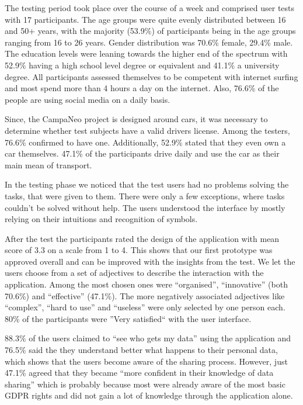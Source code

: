 \documentclass[../paper.tex]{subfiles}
\begin{document}
  The testing period took place over the course of a week and comprised
  user tests with 17 participants. The age groups were quite evenly
  distributed between 16 and 50+ years, with the majority (53.9\%) of
  participants being in the age groups ranging from 16 to 26 years.
  Gender distribution was 70.6\% female, 29.4\% male. The education levels
  were leaning towards the higher end of the spectrum with 52.9\% having a
  high school level degree or equivalent and 41.1\% a university degree.
  All participants assessed themselves to be competent with internet
  surfing and most spend more than 4 hours a day on the internet. Also,
  76.6\% of the people are using social media on a daily basis.

  Since, the CampaNeo project is designed around cars, it was necessary to
  determine whether test subjects have a valid drivers license. Among
  the testers, 76.6\% confirmed to have one. Additionally, 52.9\% stated
  that they even own a car themselves. 47.1\% of the participants drive daily
  and use the car as their main mean of transport.

  In the testing phase we noticed that the test users had no problems solving
  the tasks, that were given to them. There were only a few exceptions, where
  tasks couldn't be solved without help. The users understood the interface by
  mostly relying on their intuitions and recognition of symbols.

  After the test the participants rated the design of the application with mean score of 3.3 on a scale from 1 to 4. This shows that our first prototype was approved overall and can be improved with the insights from the test.
  We let the users choose from a set of adjectives to describe the interaction with the application. Among the most chosen ones were ``organised'', ``innovative'' (both 70.6\%) and ``effective'' (47.1\%). The more negatively associated adjectives like ``complex'', ``hard to use'' and ``useless'' were only selected by one person each.
  80\% of the participants were ''Very satisfied`` with the user interface.


  88.3\% of the users claimed to ``see who gets my data'' using the application and 76.5\% said the they understand better what happens to their personal data, which shows that the users become aware of the sharing process.
  However, just 47.1\% agreed that they became ``more confident in their knowledge of data sharing'' which is probably because most were already aware of the most basic GDPR rights and did not gain a lot of knowledge through the application alone.
\end{document}
